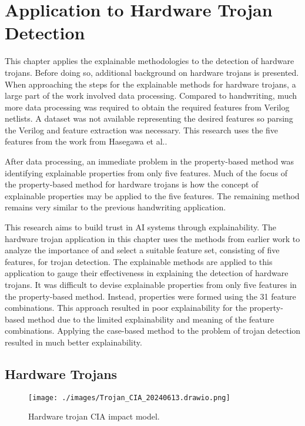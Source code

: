 \chapter{Application to Hardware Trojan Detection} \label{ch:trojan}

This chapter applies the explainable methodologies to the detection of hardware
trojans. Before doing so, additional background on hardware trojans is
presented. When approaching the steps for the explainable methods for hardware
trojans, a large part of the work involved data processing. Compared to
handwriting, much more data processing was required to obtain the required
features from Verilog netlists. A dataset was not available representing the
desired features so parsing the Verilog and feature extraction was necessary.
This research uses the five features from the work from Hasegawa et
al.\cite{7604700}.

After data processing, an immediate problem in the property-based method was
identifying explainable properties from only five features. Much of the focus of
the property-based method for hardware trojans is how the concept of explainable
properties may be applied to the five features. The remaining method remains
very similar to the previous handwriting application.

This research aims to build trust in AI systems through explainability. The
hardware trojan application in this chapter uses the methods from earlier work
to analyze the importance of and select a suitable feature set, consisting of
five features, for trojan detection\cite{7604700, hasegawa2020hardware}. The
explainable methods are applied to this application to gauge their effectiveness
in explaining the detection of hardware trojans. It was difficult to devise
explainable properties from only five features in the property-based method.
Instead, properties were formed using the 31 feature combinations. This approach
resulted in poor explainability for the property-based method due to the limited
explainability and meaning of the feature combinations. Applying the case-based
method to the problem of trojan detection resulted in much better
explainability.

\section{Hardware Trojans}

\begin{figure}[H]
    \centering
    \texttt{[image: ./images/Trojan\_CIA\_20240613.drawio.png]}
    \caption{Hardware trojan CIA impact model.}
    \label{fig:cia_impact_model}
\end{figure}

